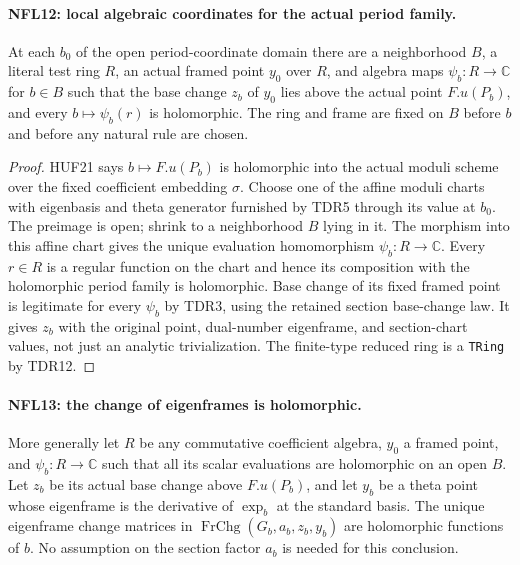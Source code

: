 \documentclass[11pt,a4paper]{article}
\numberwithin{equation}{section}
\theoremstyle{remark}\newtheorem{remark}[theorem]{Remark}
\begin{document}
\paragraph{NFL12: local algebraic coordinates for the actual period family.}
\label{claim:NFL12}
At each $b_0$ of the open period-coordinate domain there are a
neighborhood $B$, a literal test ring $R$, an actual framed point
$y_0$ over $R$, and algebra maps $\psi_b:R\to\mathbb C$ for
$b\in B$ such that the base change $z_b$ of $y_0$ lies above
the actual point $F.u(P_b)$, and every $b\mapsto\psi_b(r)$ is
holomorphic.  The ring and frame are fixed on $B$ before $b$
and before any natural rule are chosen.

\begin{proof}
HUF21 says $b\mapsto F.u(P_b)$ is holomorphic into the actual
moduli scheme over the fixed coefficient embedding $\sigma$.
Choose one of the affine moduli charts with eigenbasis and
theta generator furnished by TDR5 through its value at $b_0$.
The preimage is open; shrink to a neighborhood $B$ lying in it.
The morphism into this affine chart gives the unique evaluation
homomorphism $\psi_b:R\to\mathbb C$.  Every $r\in R$ is a
regular function on the chart and hence its composition with
the holomorphic period family is holomorphic.
Base change of its fixed framed point is legitimate for every
$\psi_b$ by TDR3, using the retained section base-change law.
It gives $z_b$ with the original point, dual-number eigenframe,
and section-chart values, not just an analytic trivialization.
The finite-type reduced ring is a \texttt{TRing} by TDR12.
\end{proof}

\paragraph{NFL13: the change of eigenframes is holomorphic.}
\label{claim:NFL13}
More generally let $R$ be any commutative coefficient algebra,
$y_0$ a framed point, and $\psi_b:R\to\mathbb C$ such that all
its scalar evaluations are holomorphic on an open $B$.
Let $z_b$ be its actual base change above $F.u(P_b)$, and let
$y_b$ be a theta point whose eigenframe is the derivative of
$\exp_b$ at the standard basis.  The unique eigenframe change
matrices in $\operatorname{FrChg}(G_b,a_b,z_b,y_b)$ are
holomorphic functions of $b$.  No assumption on the section
factor $a_b$ is needed for this conclusion.
\end{document}
